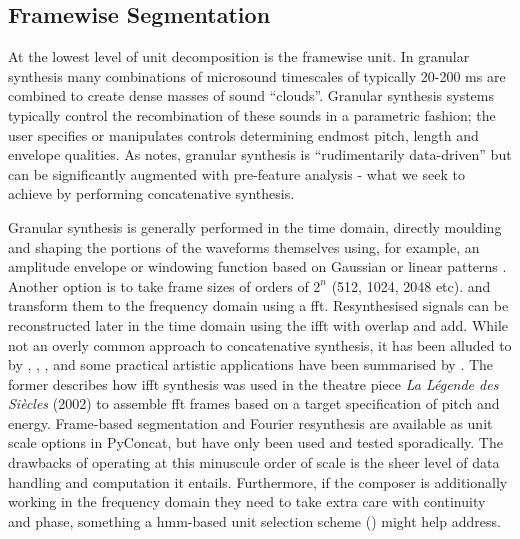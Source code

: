 \subsection{Framewise Segmentation}

At the lowest level of unit decomposition is the framewise unit. In granular synthesis many combinations of microsound timescales of typically 20-200 ms are combined to create dense masses of sound “clouds”. Granular synthesis systems typically control the recombination of these sounds in a parametric fashion; the user specifies or manipulates controls determining endmost pitch, length and envelope qualities. As \cite{Schwarz2003} notes, granular synthesis is “rudimentarily data-driven” but can be significantly augmented with pre-feature analysis - what we seek to achieve by performing concatenative synthesis. 

Granular synthesis is generally performed in the time domain, directly moulding and shaping the portions of the waveforms themselves using, for example, an amplitude envelope or windowing function based on Gaussian or linear patterns \citep{Roads1996, Roads2004}. Another option is to take frame sizes of orders of $2^n$ (512, 1024, 2048 etc). and transform them to the frequency domain using a \acrfull{fft}. Resynthesised signals can be reconstructed later in the time domain using the \acrfull{ifft} with overlap and add. While not an overly common approach to concatenative synthesis, it has been alluded to by \cite{Kobayashi}, \cite{Puckette2004}, \cite{An2012}, and some practical artistic applications have been summarised by \cite{Schwarz2006b}. The former describes how \acrshort{ifft} synthesis was used in the theatre piece \textit{La Légende des Siècles} (2002) to assemble \acrshort{fft} frames based on a target specification of pitch and energy. Frame-based segmentation and Fourier resynthesis are available as unit scale options in PyConcat, but have only been used and tested sporadically. The drawbacks of operating at this minuscule order of scale is the sheer level of data handling and computation it entails. Furthermore, if the composer is additionally working in the frequency domain they need to take extra care with continuity and phase, something a \acrshort{hmm}-based unit selection scheme () might help address. 


